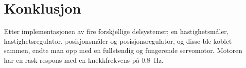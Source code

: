 \section{Konklusjon}\label{sec:konklusjon}

Etter implementasjonen av fire forskjellige delsystemer; en hastighetsmåler, hastighetsregulator, posisjonsmåler og posisjonsregulator, og disse ble koblet sammen, endte man opp med en fullstendig og fungerende servomotor. 
Motoren har en rask respons med en knekkfrekvens på {\SI{0.8}{\hertz}}.
